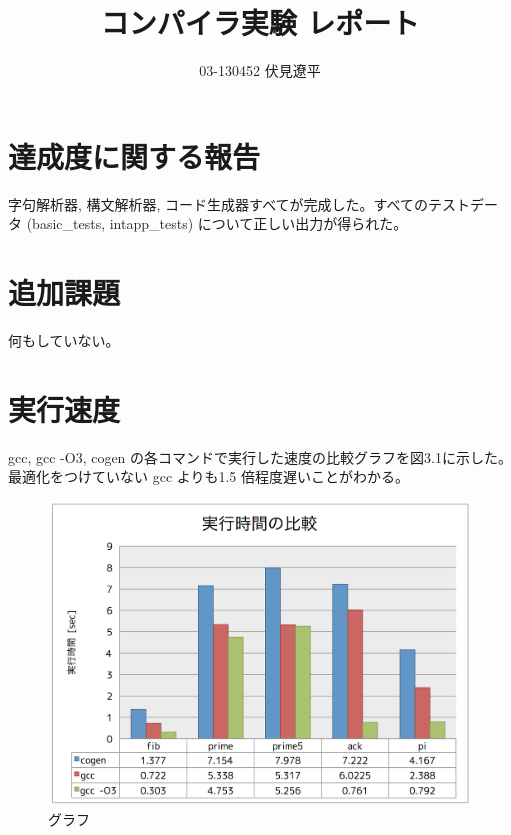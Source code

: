 \documentclass{jsarticle}
\begin{document}
 \makeatletter
    \renewcommand{\thefigure}{
    \thesection.\arabic{figure}}
  \makeatother

  \makeatletter
    \renewcommand{\thetable}{%
    \thesection.\arabic{table}}
  \makeatother

\title{コンパイラ実験 レポート}
\author{03-130452 伏見遼平}
\maketitle


\section{達成度に関する報告}

字句解析器, 構文解析器, コード生成器すべてが完成した。すべてのテストデータ (basic\_tests, intapp\_tests) について正しい出力が得られた。

\section{追加課題}

何もしていない。

\section{実行速度}

gcc, gcc -O3, cogen の各コマンドで実行した速度の比較グラフを図3.1に示した。最適化をつけていない gcc よりも1.5 倍程度遅いことがわかる。

\begin{figure}[htbp]
\begin{center}
\includegraphics[width=12cm,clip]{result.png}
\end{center}
\caption{グラフ}
\label{fig:グラフ}
\end{figure}
\end{document}

